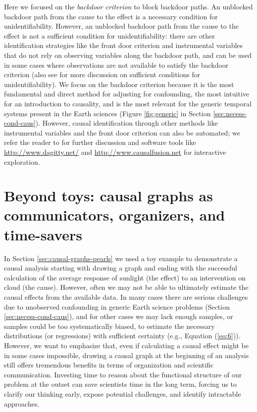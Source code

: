 \documentclass[12pt]{article}
\begin{document}
Here we focused on the \emph{backdoor criterion} to block backdoor
paths. An unblocked backdoor path from the cause to the effect is a
necessary condition for unidentifiability. However, an unblocked
backdoor path from the cause to the effect is not a sufficient
condition for unidentifiability: there are other identification
strategies like the front door criterion \citep[see Section 3.5.2
in][]{pearl2009causality} and instrumental variables \citep[see
Chapter 8 in][]{pearl2009causality} that do not rely on observing
variables along the backdoor path, and can be used in some cases where
observations are not available to satisfy the backdoor criterion (also
see \citet{tian2002general} for more discussion on sufficient
conditions for unidentifiability). We focus on the backdoor criterion
because it is the most fundamental and direct method for adjusting for
confounding, the most intuitive for an introduction to causality, and
is the most relevant for the generic temporal systems present in the
Earth sciences (Figure \ref{fig:generic} in Section
\ref{sec:necess-cond-caus}). However, causal identification through
other methods like instrumental variables and the front door criterion
can also be automated; we refer the reader to
\citet{pearl2009causality} for further discussion and software tools
like \url{http://www.dagitty.net/} and
\url{http://www.causalfusion.net} for interactive exploration.


\section{Beyond toys: causal graphs as communicators, organizers, and
  time-savers}\label{sec:causal-graphs-as}

In Section \ref{sec:causal-graphs-pearls} we used a toy example to
demonstrate a causal analysis starting with drawing a graph and ending
with the successful calculation of the average response of sunlight
(the effect) to an intervention on cloud (the cause). However, often
we may not be able to ultimately estimate the causal effects from the
available data. In many cases there are serious challenges due to
unobserved confounding in generic Earth science problems (Section
\ref{sec:necess-cond-caus}), and for other cases we may lack enough
samples, or samples could be too systematically biased, to estimate
the necessary distributions (or regressions) with sufficient certainty
(e.g., Equation (\ref{eq:6})). However, we want to emphasize that,
even if calculating a causal effect might be in some cases impossible,
drawing a causal graph at the beginning of an analysis still offers
tremendous benefits in terms of organization and scientific
communication. Investing time to reason about the functional structure
of our problem at the outset can save scientists time in the long
term, forcing us to clarify our thinking early, expose potential
challenges, and identify intractable approaches.
\end{document}
